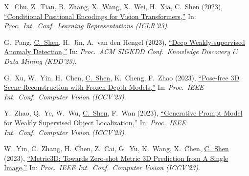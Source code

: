 \documentclass[9pt, a4paper]{article}
\newcommand{\years}[1]{\marginnote{\scriptsize #1}}
\def\highlight{\uline}
\begin{document}
\medskip

\years{2023} X.~Chu, Z.~Tian, B.~Zhang, X.~Wang, X.~Wei, H.~Xia, \highlight{C.~Shen} (2023),
\href{http://www.google.com/search?lr=&ie=UTF-8&oe=UTF-8&q=Conditional+Positional+Encodings+for+Vision+Transformers+Xiangxiang+Chu%2C+Zhi+Tian%2C+Bo+Zhang%2C+Xinlong+Wang%2C+Xiaolin+Wei%2C+Huaxia+Xia%2C+Chunhua+Shen}{``Conditional Positional Encodings for Vision Transformers,{}''}
In: \emph{Proc.\ Int.\ Conf.\  Learning Representations (ICLR'23)}.

\medskip

\years{2023} G.~Pang, \highlight{C.~Shen}, H.~Jin, A.~van den Hengel (2023),
\href{http://www.google.com/search?lr=&ie=UTF-8&oe=UTF-8&q=Deep+Weakly-supervised+Anomaly+Detection+Guansong+Pang%2C+Chunhua+Shen%2C+Huidong+Jin%2C+Anton+van+den+Hengel}{``Deep Weakly-supervised Anomaly Detection,{}''}
In: \emph{Proc.\ ACM SIGKDD Conf.\  Knowledge Discovery \& Data Mining (KDD'23)}.

\medskip

\years{2023} G.~Xu, W.~Yin, H.~Chen, \highlight{C.~Shen}, K.~Cheng, F.~Zhao (2023),
\href{http://www.google.com/search?lr=&ie=UTF-8&oe=UTF-8&q=Pose-free+3D+Scene+Reconstruction+with+Frozen+Depth+Models+Guangkai+Xu%2C+Wei+Yin%2C+Hao+Chen%2C+Chunhua+Shen%2C+Kai+Cheng%2C+Feng+Zhao}{``Pose-free 3D Scene Reconstruction with Frozen Depth Models,{}''}
In: \emph{Proc.\ IEEE Int.\ Conf.\  Computer Vision (ICCV'23)}.

\medskip

\years{2023} Y.~Zhao, Q.~Ye, W.~Wu, \highlight{C.~Shen}, F.~Wan (2023),
\href{http://www.google.com/search?lr=&ie=UTF-8&oe=UTF-8&q=Generative+Prompt+Model+for+Weakly+Supervised+Object+Localization+Yuzhong+Zhao%2C+Qixiang+Ye%2C+Weijia+Wu%2C+Chunhua+Shen%2C+Fang+Wan}{``Generative Prompt Model for Weakly Supervised Object Localization,{}''}
In: \emph{Proc.\ IEEE Int.\ Conf.\  Computer Vision (ICCV'23)}.

\medskip

\years{2023} W.~Yin, C.~Zhang, H.~Chen, Z.~Cai, G.~Yu, K.~Wang, X.~Chen, \highlight{C.~Shen} (2023),
\href{http://www.google.com/search?lr=&ie=UTF-8&oe=UTF-8&q=Metric3D%3A+Towards+Zero-shot+Metric+3D+Prediction+from+A+Single+Image+Wei+Yin%2C+Chi+Zhang%2C+Hao+Chen%2C+Zhipeng+Cai%2C+Gang+Yu%2C+Kaixuan+Wang%2C+Xiaozhi+Chen%2C+Chunhua+Shen}{``{Metric3D}: Towards Zero-shot Metric 3D Prediction from A Single Image,{}''}
In: \emph{Proc.\ IEEE Int.\ Conf.\  Computer Vision (ICCV'23)}.

\medskip
\end{document}
